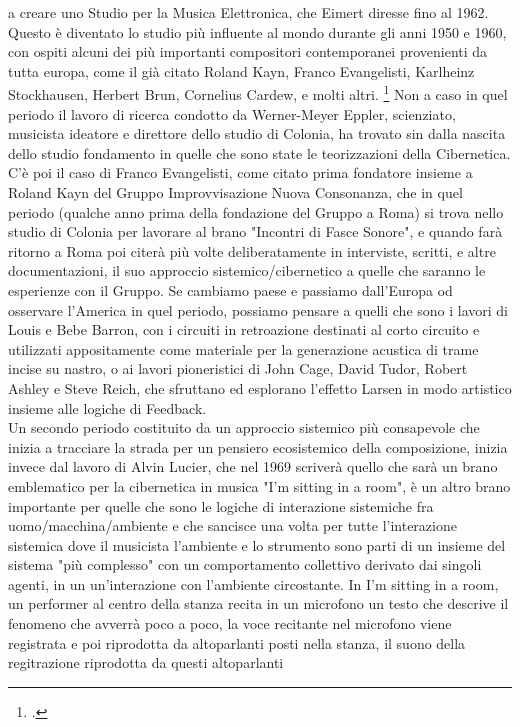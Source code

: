 a creare uno Studio per la Musica Elettronica, che Eimert diresse fino al 1962.
Questo è diventato lo studio più influente al mondo durante gli anni 1950 e 1960,
con ospiti alcuni dei più importanti compositori contemporanei provenienti da tutta europa,
come il già citato Roland Kayn, Franco Evangelisti, Karlheinz Stockhausen, Herbert Brun,
Cornelius Cardew, e molti altri. \footcite{EMSColonia}
Non a caso in quel periodo il lavoro di ricerca condotto da Werner-Meyer Eppler,
scienziato, musicista ideatore e direttore dello studio di Colonia,
ha trovato sin dalla nascita dello studio fondamento in quelle che sono state
le teorizzazioni della Cibernetica.
C'è poi il caso di Franco Evangelisti,
come citato prima fondatore insieme a Roland Kayn del Gruppo Improvvisazione Nuova Consonanza,
che in quel periodo (qualche anno prima della fondazione del Gruppo a Roma)
si trova nello studio di Colonia per lavorare al brano "Incontri di Fasce Sonore",
e quando farà ritorno a Roma poi citerà più volte deliberatamente in interviste, scritti,
e altre documentazioni, il suo approccio sistemico/cibernetico a quelle che saranno le esperienze con il Gruppo.
Se cambiamo paese e passiamo dall'Europa od osservare l'America in quel periodo,
possiamo pensare a quelli che sono i lavori di Louis e Bebe Barron,
con i circuiti in retroazione destinati al corto circuito
e utilizzati appositamente come materiale per la generazione acustica di trame incise su nastro,
o ai lavori pioneristici di
John Cage, David Tudor, Robert Ashley e Steve Reich,
che sfruttano ed esplorano l'effetto Larsen in modo artistico insieme
alle logiche di Feedback. \\
Un secondo periodo costituito da un approccio sistemico più consapevole
che inizia a tracciare la strada per un pensiero ecosistemico della composizione,
inizia invece dal lavoro
di Alvin Lucier, che nel 1969 scriverà quello che sarà un brano emblematico per
la cibernetica in musica "I'm sitting in a room",
è un altro brano importante per quelle che sono
le logiche di interazione sistemiche fra uomo/macchina/ambiente
e che sancisce una volta per tutte
l'interazione sistemica dove il musicista l'ambiente e lo strumento sono parti di un insieme del sistema "più complesso" con un comportamento collettivo derivato dai singoli agenti,
in un un'interazione con l'ambiente circostante.
In I'm sitting in a room, un performer al centro della stanza
recita in un microfono un testo che descrive il fenomeno che avverrà poco a poco,
la voce recitante nel microfono viene registrata e poi riprodotta da altoparlanti
posti nella stanza, il suono della regitrazione riprodotta da questi altoparlanti
